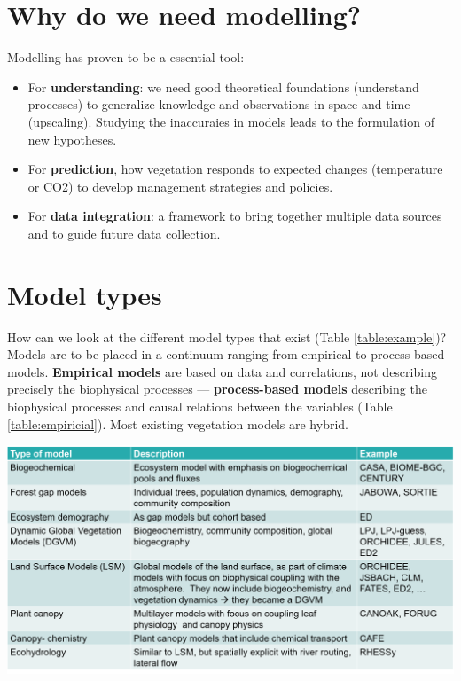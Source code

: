 \documentclass[
  12pt,
  oneside]{book}
\providecommand{\tightlist}{%
  \setlength{\itemsep}{0pt}\setlength{\parskip}{0pt}}
\begin{document}
\hypertarget{why-do-we-need-modelling}{%
\section{Why do we need modelling?}\label{why-do-we-need-modelling}}

Modelling has proven to be a essential tool:

\begin{itemize}
\tightlist
\item
  For \textbf{understanding}: we need good theoretical foundations (understand processes) to generalize knowledge and observations in space and time (upscaling). Studying the inaccuraies in models leads to the formulation of new hypotheses.
\item
  For \textbf{prediction}, how vegetation responds to expected changes (temperature or CO2) to develop management strategies and policies.
\item
  For \textbf{data integration}: a framework to bring together multiple data sources and to guide future data collection.
\end{itemize}

\hypertarget{model-types}{%
\section{Model types}\label{model-types}}

How can we look at the different model types that exist (Table \ref{table:example})? Models are to be placed in a continuum ranging from empirical to process-based models. \textbf{Empirical models} are based on data and correlations, not describing precisely the biophysical processes --- \textbf{process-based models} describing the biophysical processes and causal relations between the variables (Table \ref{table:empiricial}). Most existing vegetation models are hybrid.

\begin{center}
\label{table:example}

\begin{center}\includegraphics[width=0.8\linewidth]{figures/chap1/table_model_types} \end{center}
\end{center}
\end{document}
